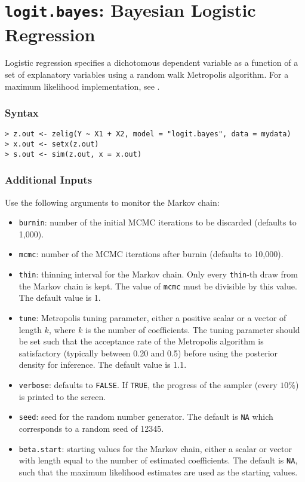 \section{\texttt{logit.bayes}: Bayesian Logistic Regression}

\label{logit.bayes}

Logistic regression specifies a dichotomous dependent variable as a
function of a set of explanatory variables using a random walk
Metropolis algorithm.  For a maximum likelihood implementation, see
.  

\subsubsection{Syntax}
\begin{verbatim}
> z.out <- zelig(Y ~ X1 + X2, model = "logit.bayes", data = mydata)
> x.out <- setx(z.out)
> s.out <- sim(z.out, x = x.out)
\end{verbatim}

\subsubsection{Additional Inputs}

Use the following arguments to monitor the Markov chain: 
\begin{itemize}
\item \texttt{burnin}: number of the initial MCMC iterations to be 
 discarded (defaults to 1,000). 

\item \texttt{mcmc}: number of the MCMC iterations after burnin
(defaults to 10,000).

\item \texttt{thin}: thinning interval for the Markov chain. Only every 
 \texttt{thin}-th draw from the Markov chain is kept. The value of 
\texttt{mcmc} must be divisible by this value. The default value is 1.

\item \texttt{tune}: Metropolis tuning parameter, either 
a positive scalar or a vector of length $k$, where $k$ is the number
of coefficients. The tuning parameter should be set such that the
acceptance rate of the Metropolis algorithm is satisfactory (typically
between 0.20 and 0.5) before using the posterior density for
inference. The default value is 1.1.

\item \texttt{verbose}: defaults to {\tt FALSE}.  If \texttt{TRUE}, the progress 
 of the sampler (every $10\%$) is printed to the screen.

\item \texttt{seed}: seed for the random number generator.  The
default is \texttt{NA} which corresponds to a random seed of 12345.

\item \texttt{beta.start}: starting values for the Markov 
chain, either a scalar or vector with length equal to the number of
estimated coefficients. The default is \texttt{NA}, such that the maximum
likelihood estimates are used as the starting values.

\end{itemize}

